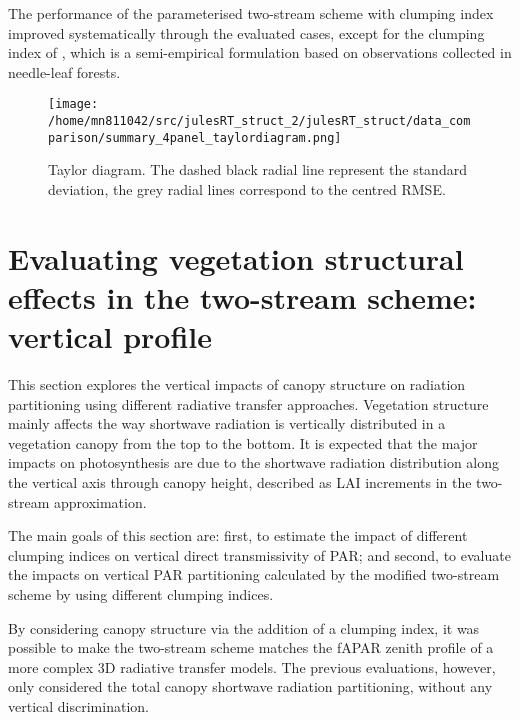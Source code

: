\documentclass[a4paper,11pt]{report}
\begin{document}
The performance of the parameterised two-stream scheme with clumping index improved systematically through the evaluated cases, except for the clumping index of \citet{Kucharik1999}, which is a semi-empirical formulation based on observations collected in needle-leaf forests. 

\begin{figure}[ht!]
\centering
\texttt{[image: /home/mn811042/src/julesRT\_struct\_2/julesRT\_struct/data\_comparison/summary\_4panel\_taylordiagram.png]}
\caption{Taylor diagram. The dashed black radial line represent the standard deviation, the grey radial lines correspond to the centred RMSE.} 
\label{fig:taylor_chapter4}
\end{figure}

\section{Evaluating vegetation structural effects in the two-stream scheme: vertical profile}\label{section:vertical_profile}

This section explores the vertical impacts of canopy structure on radiation partitioning using different radiative transfer approaches. Vegetation structure mainly affects the way shortwave radiation is vertically distributed in a vegetation canopy from the top to the bottom. It is expected that the major impacts on photosynthesis are due to the shortwave radiation distribution along the vertical axis through canopy height, described as LAI increments in the two-stream approximation. 


The main goals of this section are: first, to estimate the impact of different clumping indices on vertical direct transmissivity of PAR; and second, to evaluate the impacts on vertical PAR partitioning calculated by the modified two-stream scheme by using different clumping indices.

By considering canopy structure via the addition of a clumping index, it was possible to make the two-stream scheme matches the fAPAR zenith profile of a more complex 3D radiative transfer models. The previous evaluations, however, only considered the total canopy shortwave radiation partitioning, without any vertical discrimination.
\end{document}
